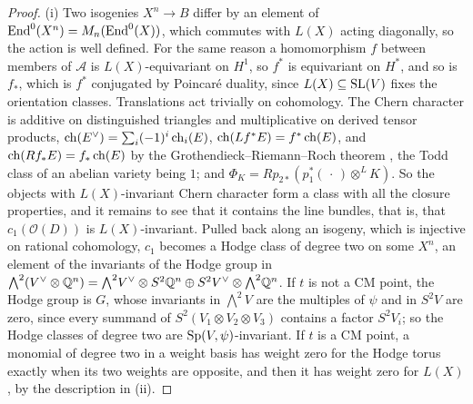 \begin{proof}
(i) Two isogenies $X^{n}\to B$ differ by an element of $\operatorname{End}^{0}(X^{n})=
M_{n}(\operatorname{End}^{0}(X))$, which commutes with $L(X)$ acting diagonally, so the
action is well defined. For the same reason a homomorphism $f$ between members
of $\mathcal{A}$ is $L(X)$-equivariant on $H^{1}$, so $f^{*}$ is equivariant
on $H^{*}$, and so is $f_{*}$, which is $f^{*}$ conjugated by Poincar\'e
duality, since $L(X)\subseteq\operatorname{SL}(V)$ fixes the orientation classes.
Translations act trivially on cohomology. The Chern character is additive on
distinguished triangles and multiplicative on derived tensor products,
$\operatorname{ch}(E^{\vee})=\sum_{i}(-1)^{i}\operatorname{ch}_{i}(E)$, $\operatorname{ch}(Lf^{*}E)=f^{*}\operatorname{ch}(E)$, and
$\operatorname{ch}(Rf_{*}E)=f_{*}\operatorname{ch}(E)$ by the Grothendieck--Riemann--Roch theorem
\cite[Theorem~15.2]{Ful98}, the Todd class of an abelian variety being $1$;
and $\Phi_{K}=Rp_{2*}(p_{1}^{*}(\,\cdot\,)\otimes^{L}K)$. So the objects with
$L(X)$-invariant Chern character form a class with all the closure
properties, and it remains to see that it contains the line bundles, that is,
that $c_{1}(\mathcal{O}(D))$ is $L(X)$-invariant. Pulled back along an
isogeny, which is injective on rational cohomology, $c_{1}$ becomes a Hodge
class of degree two on some $X^{n}$, an element of the invariants of the
Hodge group in ${\textstyle\bigwedge^{2}}(V^{\vee}\otimes\mathbb{Q}^{n})=
{\textstyle\bigwedge^{2}}V^{\vee}\otimes S^{2}\mathbb{Q}^{n}\oplus S^{2}V^{\vee}
\otimes{\textstyle\bigwedge^{2}}\mathbb{Q}^{n}$. If $t$ is not a CM point, the Hodge
group is $G$, whose invariants in ${\textstyle\bigwedge^{2}}V$ are the multiples of $\psi$
and in $S^{2}V$ are zero, since every summand of $S^{2}(V_{1}\otimes V_{2}
\otimes V_{3})$ contains a factor $S^{2}V_{i}$; so the Hodge classes of degree
two are $\operatorname{Sp}(V,\psi)$-invariant. If $t$ is a CM point, a monomial of degree two
in a weight basis has weight zero for the Hodge torus exactly when its two
weights are opposite, and then it has weight zero for $L(X)$, by the
description in (ii).


\end{proof}

